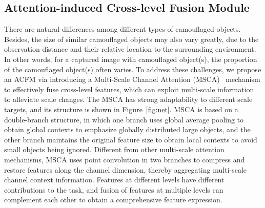 \documentclass{article}
\begin{document}



\subsection{Attention-induced Cross-level Fusion Module}

There are natural differences among different types of camouflaged objects. Besides, the size of similar camouflaged objects may also vary greatly, due to the observation distance and their relative location to the surrounding environment. In other words, for a captured image with camouflaged object(s), the proportion of the camouflaged object(s) often varies. To address these challenges, we propose an ACFM via introducing a Multi-Scale Channel Attention (MSCA)~\cite{aff} mechanism to effectively fuse cross-level features, which can exploit multi-scale information to alleviate scale changes. The MSCA has strong adaptability to different scale targets, and its structure is shown in Figure~\ref{fig:net}. MSCA is based on a double-branch structure, in which one branch uses global average pooling to obtain global contexts to emphasize globally distributed large objects, and the other branch maintains the original feature size to obtain local contexts to avoid small objects being ignored. Different from other multi-scale attention mechanisms, MSCA uses point convolution in two branches to compress and restore features along the channel dimension, thereby aggregating multi-scale channel context information. Features at different levels have different contributions to the task, and fusion of features at multiple levels can complement each other to obtain a comprehensive feature expression. 
\end{document}
